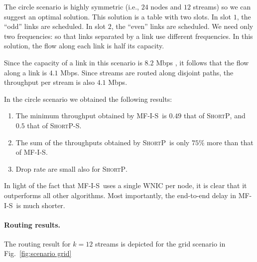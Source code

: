\documentclass[12pt]{article}
\newenvironment{proof sketch}[1]{\noindent {\emph{Proof sketch of #1:}}}{\hfill \qed}
\newcommand{\algA}{\textsc{MF-I-S}}
\newcommand{\algB}{\textsc{ShortP}}
\newcommand{\algBS}{\textsc{ShortP-S}}
\begin{document}
The circle scenario is highly symmetric (i.e., $24$ nodes and $12$
streams) so we can suggest an optimal solution.  This solution is a
table with two slots.  In slot $1$, the ``odd'' links are scheduled.
In slot $2$, the ``even'' links are scheduled.  We need only two
frequencies: so that links separated by a link use different
frequencies.
In this solution, the flow along each link is half its capacity.

Since the capacity of a link in this scenario is $8.2$ Mbps , it follows that
the flow along a link is $4.1$ Mbps. Since streams are routed along
disjoint paths, the throughput per stream is also $4.1$ Mbps.

In the circle scenario we obtained the following results:
\begin{enumerate}[(1)]
\item The minimum throughput obtained by \algA\ is $0.49$ that of \algB, and $0.5$ that of \algBS.
\item The sum of the throughputs obtained by \algB\ is only $75$\% more than that of
  \algA.
\item Drop rate are small also for \algB.
\end{enumerate}

In light of the fact that \algA\ uses a single WNIC per node, it is
clear that it outperforms all other algorithms. Most importantly, the
end-to-end delay in \algA\ is much shorter.

  


\paragraph{Routing results.}
The routing result for $k=12$ streams is depicted for the grid
scenario in Fig.~\ref{fig:scenario grid}
\end{document}

